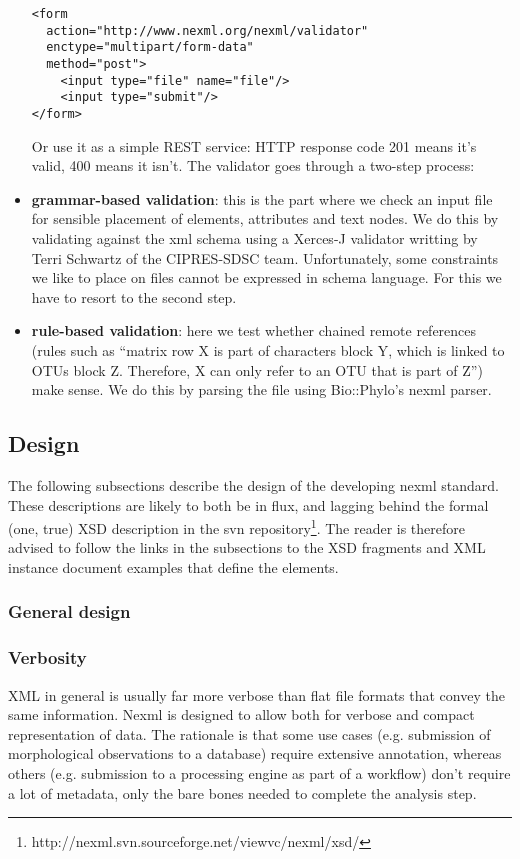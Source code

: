 \documentclass{article}
\begin{document}
\begin{itemize}
\begin{verbatim}
<form 
  action="http://www.nexml.org/nexml/validator" 
  enctype="multipart/form-data" 
  method="post">
    <input type="file" name="file"/>
    <input type="submit"/>
</form>
\end{verbatim}
	
Or use it as a simple REST service: HTTP response code 201 means it's valid, 400 means it isn't. The validator goes through a two-step process:

\item \textbf{grammar-based validation}: this is the part where we check an input file for sensible placement of elements, attributes and text nodes. We do this by validating against the xml schema using a Xerces-J validator writting by Terri Schwartz of the CIPRES-SDSC team. Unfortunately, some constraints we like to place on files cannot be expressed in schema language. For this we have to resort to the second step.	

\item \textbf{rule-based validation}: here we test whether chained remote references (rules such as ``matrix row X is part of characters block Y, which is linked to OTUs block Z. Therefore, X can only refer to an OTU that is part of Z'') make sense. We do this by parsing the file using Bio::Phylo's nexml parser. 

\end{itemize}

\subsection{Design}
The following subsections describe the design of the developing nexml standard.
These descriptions are likely to both be in flux, and lagging behind the formal (one, true) XSD description in the svn repository\footnote{http://nexml.svn.sourceforge.net/viewvc/nexml/xsd/}. The reader is therefore advised to follow the links in the subsections to the XSD fragments and XML instance document examples that define the elements.

\subsubsection{General design}

\subsubsection{Verbosity}
XML in general is usually far more verbose than flat file formats that convey the same information. Nexml is designed to allow both for verbose and compact representation of data. The rationale is that some use cases (e.g. submission of morphological observations to a database) require extensive annotation, whereas others (e.g. submission to a processing engine as part of a workflow) don't require a lot of metadata, only the bare bones needed to complete the analysis step.
\end{document}
